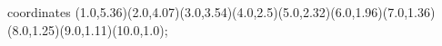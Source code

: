 					coordinates { (1.0,5.36)(2.0,4.07)(3.0,3.54)(4.0,2.5)(5.0,2.32)(6.0,1.96)(7.0,1.36)(8.0,1.25)(9.0,1.11)(10.0,1.0)};